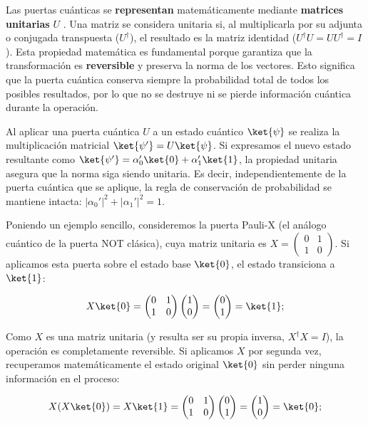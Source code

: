 Las puertas cuánticas se \textbf{representan} matemáticamente mediante \textbf{matrices unitarias} $U$ \cite{gopalan_module3_2022}. Una matriz se considera unitaria si, al multiplicarla por su adjunta o conjugada transpuesta ($U^{\dagger}$), el resultado es la matriz identidad ($U^{\dagger}U = U U^{\dagger} = I$). Esta propiedad matemática es fundamental porque garantiza que la transformación es \textbf{reversible} y preserva la norma de los vectores. Esto significa que la puerta cuántica conserva siempre la probabilidad total de todos los posibles resultados, por lo que no se destruye ni se pierde información cuántica durante la operación.

Al aplicar una puerta cuántica $U$ a un estado cuántico $\ket{\psi}$ se realiza la multiplicación matricial $\ket{\psi'} = U \ket{\psi}$. Si expresamos el nuevo estado resultante como $\ket{\psi'} = \alpha_0' \ket{0} + \alpha_1' \ket{1}$, la propiedad unitaria asegura que la norma siga siendo unitaria. Es decir, independientemente de la puerta cuántica que se aplique, la regla de conservación de probabilidad se mantiene intacta: $|\alpha_0'|^2 + |\alpha_1'|^2 = 1$.

Poniendo un ejemplo sencillo, consideremos la puerta Pauli-X (el análogo cuántico de la puerta NOT clásica), cuya matriz unitaria es $X = \begin{pmatrix} 0 & 1 \\ 1 & 0 \end{pmatrix}$. Si aplicamos esta puerta sobre el estado base $\ket{0}$, el estado transiciona a $\ket{1}$:

\[
    X \ket{0} = \begin{pmatrix} 0 & 1 \\ 1 & 0 \end{pmatrix} \begin{pmatrix} 1 \\ 0 \end{pmatrix} = \begin{pmatrix} 0 \\ 1 \end{pmatrix} = \ket{1};
\]

Como $X$ es una matriz unitaria (y resulta ser su propia inversa, $X^{\dagger}X = I$), la operación es completamente reversible. Si aplicamos $X$ por segunda vez, recuperamos matemáticamente el estado original $\ket{0}$ sin perder ninguna información en el proceso:

\[
    X (X \ket{0}) = X \ket{1} = \begin{pmatrix} 0 & 1 \\ 1 & 0 \end{pmatrix} \begin{pmatrix} 0 \\ 1 \end{pmatrix} = \begin{pmatrix} 1 \\ 0 \end{pmatrix} = \ket{0};
\]

